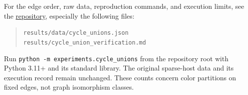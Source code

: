 \documentclass[11pt,letterpaper]{article}
\begin{document}
For the edge order, raw data, reproduction commands, and execution limits,
see the \href{https://github.com/Akhil-rav/discrete-math-lab}{repository},
especially the following files:
\begin{quote}\small
\nolinkurl{results/data/cycle_unions.json}\\
\nolinkurl{results/cycle_union_verification.md}
\end{quote}
Run \texttt{python -m experiments.cycle\_unions} from the repository root
with Python 3.11+ and its standard library. The original sparse-host data
and its execution record remain unchanged.
These counts concern color partitions on fixed edges, not graph
isomorphism classes.
\end{document}
